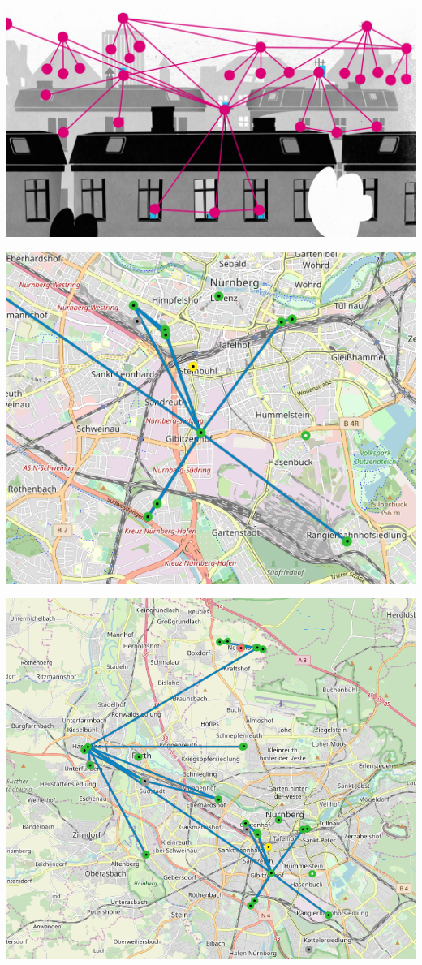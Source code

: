 \documentclass{beamer}
\begin{document}
	\begin{frame}
		\includegraphics[width=\framewidth]{media/dachzudach.png}
	\end{frame}
	\begin{frame}
		\includegraphics[height=\textheight]{media/rf_nbg.png}
	\end{frame}
	\begin{frame}
		\includegraphics[height=\textheight]{media/rf_nbgfue.png}
	\end{frame}
\end{document}
